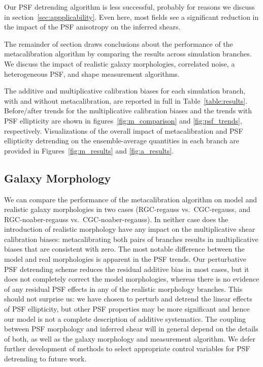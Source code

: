 \documentclass[iop]{emulateapj}
\newcommand\rmcomment[1]{\textcolor{red}{(RM: #1)}}
\begin{document}
Our PSF detrending algorithm is less successful, probably for reasons
we discuss in section~\ref{sec:appplicability}. Even here, most fields
see a significant reduction in the impact of the PSF anisotropy on the inferred
shears.

The remainder of section draws conclusions about the performance of the
metacalibration algorithm by comparing the results across simulation
branches. We discuss the impact of realistic galaxy morphologies,
correlated noise, a heterogeneous PSF, and shape measurement
algorithms.

The additive and multiplicative calibration biases for each simulation
branch, with and without metacalibration, are reported in full in
Table~\ref{table:results}. Before/after trends for the multiplicative
calibration biases and the trends with PSF ellipticity are shown in
figures~\ref{fig:m_comparison} and \ref{fig:psf_trends},
respectively. Visualizations of the overall impact of metacalibration
and PSF ellipticity detrending on the ensemble-average quantities in
each branch are provided in Figures~\ref{fig:m_results} and
\ref{fig:a_results}.


\subsection{Galaxy Morphology}
We can compare the performance of the metacalibration algorithm on
model and realistic galaxy morphologies in two cases (RGC-regauss vs.\
CGC-regauss, and RGC-noaber-regauss vs.\ CGC-noaber-regauss). In
neither case does the introduction of realistic morphology have any
impact on the multiplicative shear calibration biases: metacalibrating
both pairs of branches results in multiplicative biases that are
consistent with zero.  The most notable difference between the model
and real morphologies is apparent in the PSF trends. Our perturbative
PSF detrending scheme reduces the residual additive bias in most
cases, but it does not completely correct the model morphologies,
whereas there is no evidence of any residual PSF effects in any of the
realistic morphology branches.  This should not surprise us: we have
chosen to perturb and detrend the linear effects of PSF ellipticity,
but other PSF properties may be more significant and hence our model
is not a complete description of additive systematics. The coupling
between PSF morphology and inferred shear will in general depend on
the details of both, as well as the galaxy morphology and measurement
algorithm. We defer further development of methods to select
appropriate control variables for PSF detrending to future work.
\end{document}
